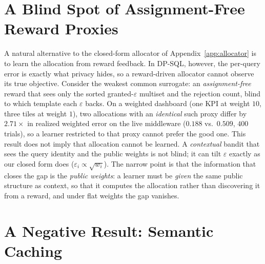 \documentclass[sigconf,nonacm]{acmart}
\newcommand{\eps}{\varepsilon}
\begin{document}
\section{A Blind Spot of Assignment-Free Reward Proxies}
\label{app:identifiability}

A natural alternative to the closed-form allocator of Appendix~\ref{app:allocator} is to learn the allocation from reward feedback. In DP-SQL, however, the per-query error is exactly what privacy hides, so a reward-driven allocator cannot observe its true objective. Consider the weakest common surrogate: an \emph{assignment-free} reward that sees only the sorted granted-$\eps$ multiset and the rejection count, blind to which template each $\eps$ backs. On a weighted dashboard (one KPI at weight $10$, three tiles at weight $1$), two allocations with an \emph{identical} such proxy differ by $2.71\times$ in realized weighted error on the live middleware ($0.188$ vs.\ $0.509$, $400$ trials), so a learner restricted to that proxy cannot prefer the good one. This result does not imply that allocation cannot be learned. A \emph{contextual} bandit that sees the query identity and the public weights is not blind; it can tilt $\eps$ exactly as our closed form does ($\eps_i\propto\sqrt{w_i}$). The narrow point is that the information that closes the gap is the \emph{public weights}: a learner must be \emph{given} the same public structure as context, so that it computes the allocation rather than discovering it from a reward, and under flat weights the gap vanishes.
\section{A Negative Result: Semantic Caching}
\label{app:semantic}
\end{document}
